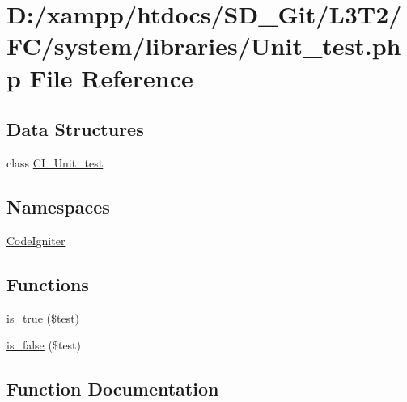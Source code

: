 \hypertarget{system_2libraries_2_unit__test_8php}{}\section{D\+:/xampp/htdocs/\+S\+D\+\_\+\+Git/\+L3\+T2/\+F\+C/system/libraries/\+Unit\+\_\+test.php File Reference}
\label{system_2libraries_2_unit__test_8php}
\subsection*{Data Structures}
\begin{DoxyCompactItemize}
\item 
class \hyperlink{class_c_i___unit__test}{C\+I\+\_\+\+Unit\+\_\+test}
\end{DoxyCompactItemize}
\subsection*{Namespaces}
\begin{DoxyCompactItemize}
\item 
 \hyperlink{namespace_code_igniter}{Code\+Igniter}
\end{DoxyCompactItemize}
\subsection*{Functions}
\begin{DoxyCompactItemize}
\item 
\hyperlink{system_2libraries_2_unit__test_8php_acf75638429e85f5d2eb23c85ce46f85b}{is\+\_\+true} (\$test)
\item 
\hyperlink{system_2libraries_2_unit__test_8php_a2fdef4e023452d31fcf5b3085bc9b25f}{is\+\_\+false} (\$test)
\end{DoxyCompactItemize}


\subsection{Function Documentation}
\hypertarget{system_2libraries_2_unit__test_8php_a2fdef4e023452d31fcf5b3085bc9b25f}{}
